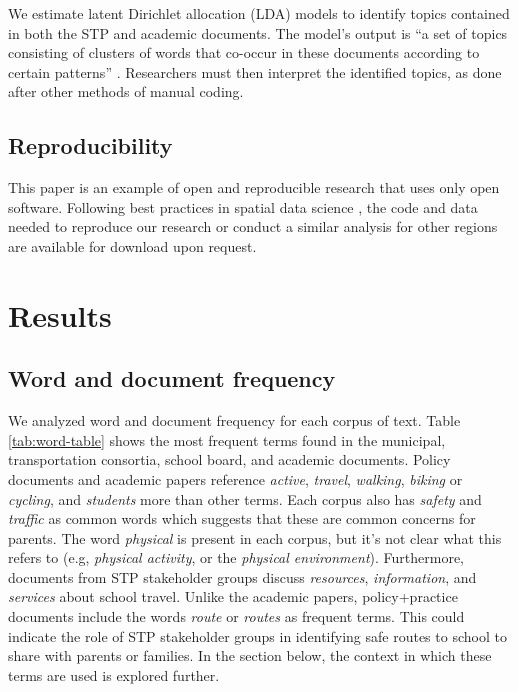 \documentclass[preprint, 3p,
authoryear]{elsarticle} %
\begin{document}
We estimate latent Dirichlet allocation (LDA) models to identify topics
contained in both the STP and academic documents. The model's output is
``a set of topics consisting of clusters of words that co-occur in these
documents according to certain patterns''
\citep{jacobiQuantitativeAnalysisLarge2016}. Researchers must then
interpret the identified topics, as done after other methods of manual
coding.

\hypertarget{reproducibility}{%
\subsection{Reproducibility}\label{reproducibility}}

This paper is an example of open and reproducible research that uses
only open software. Following best practices in spatial data science
\citep{brunsdon2020opening}, the code and data needed to reproduce our
research or conduct a similar analysis for other regions are available
for download upon request.

\hypertarget{results}{%
\section{Results}\label{results}}

\hypertarget{word-and-document-frequency}{%
\subsection{Word and document
frequency}\label{word-and-document-frequency}}

We analyzed word and document frequency for each corpus of text. Table
\ref{tab:word-table} shows the most frequent terms found in the
municipal, transportation consortia, school board, and academic
documents. Policy documents and academic papers reference \emph{active},
\emph{travel}, \emph{walking}, \emph{biking} or \emph{cycling}, and
\emph{students} more than other terms. Each corpus also has
\emph{safety} and \emph{traffic} as common words which suggests that
these are common concerns for parents. The word \emph{physical} is
present in each corpus, but it's not clear what this refers to (e.g,
\emph{physical activity}, or the \emph{physical environment}).
Furthermore, documents from STP stakeholder groups discuss
\emph{resources}, \emph{information}, and \emph{services} about school
travel. Unlike the academic papers, policy+practice documents include
the words \emph{route} or \emph{routes} as frequent terms. This could
indicate the role of STP stakeholder groups in identifying safe routes
to school to share with parents or families. In the section below, the
context in which these terms are used is explored further.
\end{document}
